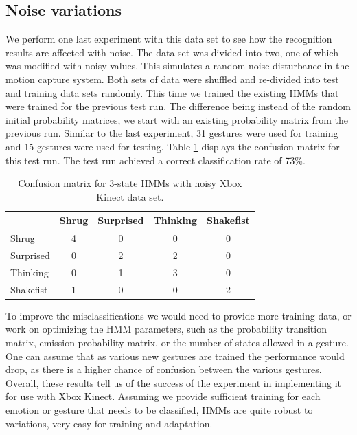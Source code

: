 \documentclass[]{report}   %
\begin{document}
\subsection*{Noise variations}
We perform one last experiment with this data set to see how the recognition results are affected with noise. The data set was divided into two, one of which was modified with noisy values. This simulates a random noise disturbance in the motion capture system. Both sets of data were shuffled and re-divided into test and training data sets randomly. This time we trained the existing HMMs that were trained for the previous test run. The difference being instead of the random initial probability matrices, we start with an existing probability matrix from the previous run. Similar to the last experiment, 31 gestures were used for training and 15 gestures were used for testing. Table \ref{tab:xboxdim3state3} displays the confusion matrix for this test run. The test run achieved a correct classification rate of 73\%. 
\begin{table}[htbp]
	\centering
		\begin{tabular}{|l|c|c|c|c|}
		\hline
             & Shrug & Surprised & Thinking & Shakefist \\ \hline
        Shrug 		& 4     & 0    & 0     & 0   \\ \hline
        Surprised 	& 0     & 2    & 2     & 0   \\ \hline
        Thinking 	& 0     & 1    & 3     & 0  \\ \hline
        Shakefist   & 1     & 0    & 0     & 2  \\
		\hline
		\end{tabular}
	\caption{Confusion matrix for 3-state HMMs with noisy Xbox Kinect data set.}
	\label{tab:xboxdim3state3}
\end{table}
To improve the misclassifications we would need to provide more training data, or work on optimizing the HMM parameters, such as the probability transition matrix, emission probability matrix, or the number of states allowed in a gesture. One can assume that as various new gestures are trained the performance would drop, as there is a higher chance of confusion between the various gestures. Overall, these results tell us of the success of the experiment in implementing it for use with Xbox Kinect. Assuming we provide sufficient training for each emotion or gesture that needs to be classified, HMMs are quite robust to variations, very easy for training and adaptation. 
\end{document}

